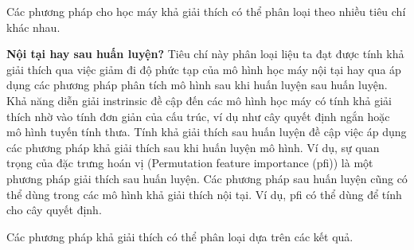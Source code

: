 Các phương pháp cho học máy khả giải thích có thể phân loại theo nhiều tiêu chí khác nhau.

\textbf{Nội tại hay sau huấn luyện?} Tiêu chí này phân loại liệu ta đạt được tính khả giải thích qua việc giảm đi độ phức tạp của mô hình học máy nội tại hay qua áp dụng các phương pháp phân tích mô hình sau khi huấn luyện sau huấn luyện. Khả năng diễn giải instrinsic đề cập đến các mô hình học máy có tính khả giải thích nhờ vào tính đơn giản của cấu trúc, ví dụ như cây quyết định ngắn hoặc mô hình tuyến tính thưa. Tính khả giải thích sau huấn luyện đề cập việc áp dụng các phương pháp khả giải thích sau khi huấn luyện mô hình. Ví dụ, sự quan trọng của đặc trưng hoán vị (Permutation feature importance (pfi)) là một phương pháp giải thích sau huấn luyện. Các phương pháp sau huấn luyện cũng có thể dùng trong các mô hình khả giải thích nội tại. Ví dụ, pfi có thể dùng để tính cho cây quyết định. 

Các phương pháp khả giải thích có thể phân loại dựa trên các kết quả.

